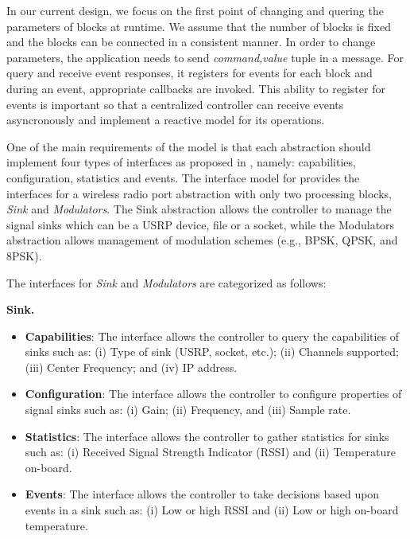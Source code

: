 In our current design, we focus on the first point of changing and quering the parameters of blocks at runtime. We assume that the number of blocks is fixed and the blocks can be connected in a consistent manner. In order to change parameters, the application needs to send \emph{\big \langle command,value\big \rangle} tuple in a message. For query and receive event responses, it registers for events for each block and during an event, appropriate callbacks are invoked. This ability to register for events is important so that a centralized controller can receive events asyncronously and implement a reactive model for its operations.
    
One of the main requirements of the \crossflow model is that each abstraction should implement four types of interfaces as proposed in \cite{Casey:14}, namely: capabilities, configuration, statistics and events. The interface model for \crossflow provides the interfaces for a wireless radio port abstraction with only two processing blocks, \emph{Sink} and \emph{Modulators}. The Sink abstraction allows the controller to manage the signal sinks which can be a USRP device, file or a socket, while the Modulators abstraction allows management of modulation schemes (e.g., BPSK, QPSK, and 8PSK).

The interfaces for \emph{Sink} and \emph{Modulators} are categorized as follows:

\textbf{Sink.}
\begin{itemize}
\item \textbf{Capabilities}: The interface allows the controller to query the capabilities of sinks such as:
    (i)  Type of sink (USRP, socket, etc.);
    (ii) Channels supported; 
    (iii) Center Frequency; and
    (iv) IP address. 
\item \textbf{Configuration}: The interface allows the controller to configure properties of signal sinks such as:
    (i) Gain;
    (ii) Frequency, and
    (iii) Sample rate.
\item \textbf{Statistics}: The interface allows the controller to gather statistics for sinks such as:
    (i) Received Signal Strength Indicator (RSSI) and 
    (ii) Temperature on-board.
\item \textbf{Events}: The interface allows the controller to take decisions based upon events in a sink such as:
    (i) Low or high RSSI and
    (ii) Low or high on-board temperature.
\end{itemize}

